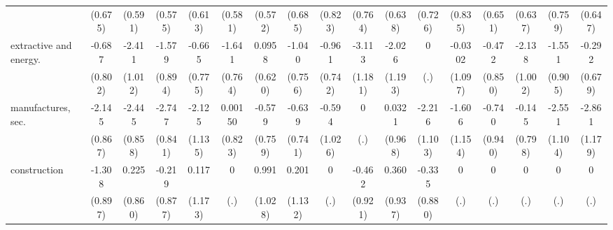 {\begin{tabular}{l*{16}{c}}
                    &     (0.675)         &     (0.591)         &     (0.575)         &     (0.613)         &     (0.581)         &     (0.572)         &     (0.685)         &     (0.823)         &     (0.764)         &     (0.638)         &     (0.726)         &     (0.835)         &     (0.651)         &     (0.637)         &     (0.759)         &     (0.647)         \\
[1em]
extractive and energy.&      -0.687         &      -2.411\sym{*}  &      -1.579         &      -0.665         &      -1.641\sym{*}  &      0.0958         &      -1.040         &      -0.961         &      -3.113\sym{**} &      -2.026         &           0         &     -0.0302         &      -0.472         &      -2.138\sym{*}  &      -1.551         &      -0.292         \\
                    &     (0.802)         &     (1.012)         &     (0.894)         &     (0.775)         &     (0.764)         &     (0.620)         &     (0.756)         &     (0.742)         &     (1.181)         &     (1.193)         &         (.)         &     (1.097)         &     (0.850)         &     (1.002)         &     (0.905)         &     (0.679)         \\
[1em]
manufactures, sec.  &      -2.145\sym{*}  &      -2.445\sym{**} &      -2.747\sym{**} &      -2.125         &     0.00150         &      -0.579         &      -0.639         &      -0.594         &           0         &      0.0321         &      -2.216\sym{*}  &      -1.606         &      -0.740         &      -0.145         &      -2.551\sym{*}  &      -2.861\sym{*}  \\
                    &     (0.867)         &     (0.858)         &     (0.841)         &     (1.135)         &     (0.823)         &     (0.759)         &     (0.741)         &     (1.026)         &         (.)         &     (0.968)         &     (1.103)         &     (1.154)         &     (0.940)         &     (0.798)         &     (1.104)         &     (1.179)         \\
[1em]
construction        &      -1.308         &       0.225         &      -0.219         &       0.117         &           0         &       0.991         &       0.201         &           0         &      -0.462         &       0.360         &      -0.335         &           0         &           0         &           0         &           0         &           0         \\
                    &     (0.897)         &     (0.860)         &     (0.877)         &     (1.173)         &         (.)         &     (1.028)         &     (1.132)         &         (.)         &     (0.921)         &     (0.937)         &     (0.880)         &         (.)         &         (.)         &         (.)         &         (.)         &         (.)         \\

\end{tabular}}
